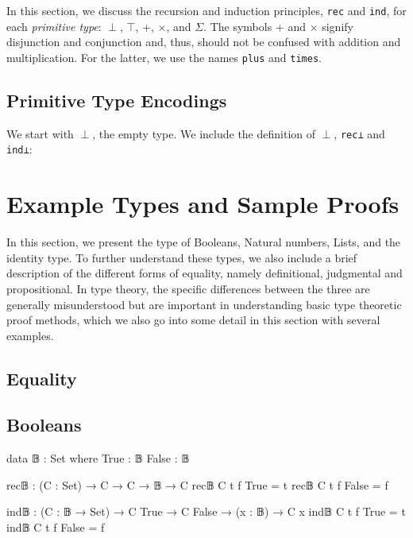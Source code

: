 \documentclass[12pt]{article}
\begin{document}
In this section, we discuss the recursion and induction principles, {\tt rec}
and {\tt ind}, for each {\em primitive type}: \(\perp\), \(\top\), +,
\(\times\), and \(\Sigma\). The symbols + and \(\times\) signify disjunction
and conjunction and, thus, should not be confused with addition and
multiplication. For the latter, we use the names {\tt plus} and {\tt times}.

\subsection*{Primitive Type Encodings}
We start with \(\perp\), the empty type. We include the definition of \(\perp\),
{\tt rec⊥} and {\tt ind⊥}:

\section{Example Types and Sample Proofs}
In this section, we present the type of Booleans, Natural numbers, Lists,
and the identity type. To further understand these types, we also include
a brief description of the different forms of equality, namely definitional,
judgmental and propositional. In type theory, the specific differences
between the three are generally misunderstood but are important in understanding
basic type theoretic proof methods, which we also go into some detail in
this section with several examples.

\subsection*{Equality}

\subsection*{Booleans}
\begin{center}
\begin{minipage}{0.9\textwidth}
\begin{code}
data 𝔹 : Set where
  True  : 𝔹
  False : 𝔹

rec𝔹 : (C : Set) → C → C → 𝔹 → C
rec𝔹 C t f True = t
rec𝔹 C t f False = f

ind𝔹 : (C : 𝔹 → Set) → C True → C False → (x : 𝔹) → C x
ind𝔹 C t f True = t
ind𝔹 C t f False = f
\end{code}
\end{minipage}
\end{center}
\end{document}

